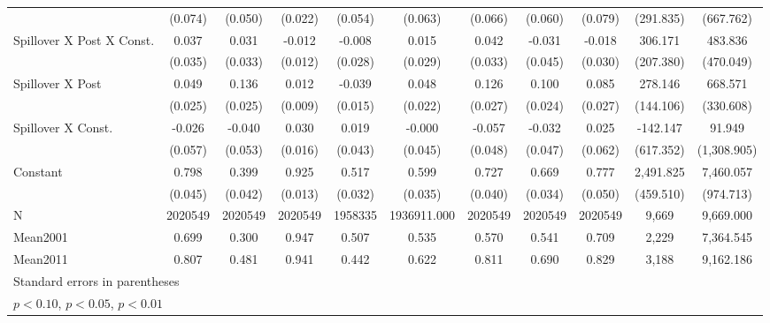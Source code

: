{\begin{tabular}{l*{10}{c}}
                &  (0.074)         &  (0.050)         &  (0.022)         &  (0.054)         &  (0.063)         &  (0.066)         &  (0.060)         &  (0.079)         &(291.835)         &(667.762)         \\
[1em]
Spillover X Post X Const.&    0.037         &    0.031         &   -0.012         &   -0.008         &    0.015         &    0.042         &   -0.031         &   -0.018         &  306.171         &  483.836         \\
                &  (0.035)         &  (0.033)         &  (0.012)         &  (0.028)         &  (0.029)         &  (0.033)         &  (0.045)         &  (0.030)         &(207.380)         &(470.049)         \\
[1em]
Spillover X Post&    0.049\sym{*}  &    0.136\sym{***}&    0.012         &   -0.039\sym{**} &    0.048\sym{**} &    0.126\sym{***}&    0.100\sym{***}&    0.085\sym{***}&  278.146\sym{*}  &  668.571\sym{**} \\
                &  (0.025)         &  (0.025)         &  (0.009)         &  (0.015)         &  (0.022)         &  (0.027)         &  (0.024)         &  (0.027)         &(144.106)         &(330.608)         \\
[1em]
Spillover X Const.&   -0.026         &   -0.040         &    0.030\sym{*}  &    0.019         &   -0.000         &   -0.057         &   -0.032         &    0.025         & -142.147         &   91.949         \\
                &  (0.057)         &  (0.053)         &  (0.016)         &  (0.043)         &  (0.045)         &  (0.048)         &  (0.047)         &  (0.062)         &(617.352)         &(1,308.905)         \\
[1em]
Constant        &    0.798\sym{***}&    0.399\sym{***}&    0.925\sym{***}&    0.517\sym{***}&    0.599\sym{***}&    0.727\sym{***}&    0.669\sym{***}&    0.777\sym{***}&2,491.825\sym{***}&7,460.057\sym{***}\\
                &  (0.045)         &  (0.042)         &  (0.013)         &  (0.032)         &  (0.035)         &  (0.040)         &  (0.034)         &  (0.050)         &(459.510)         &(974.713)         \\
\hline
N               &2020549         &2020549        &2020549         &1958335         &1936911.000         &2020549         &2020549         &2020549         &9,669         &9,669.000         \\
Mean2001        &    0.699         &    0.300         &    0.947         &    0.507         &    0.535         &    0.570         &    0.541         &    0.709         &2,229         &7,364.545         \\
Mean2011        &    0.807         &    0.481         &    0.941         &    0.442         &    0.622         &    0.811         &    0.690         &    0.829         &3,188         &9,162.186         \\
\hline\hline
\multicolumn{11}{l}{\footnotesize Standard errors in parentheses}\\
\multicolumn{11}{l}{\footnotesize \sym{*} \(p<0.10\), \sym{**} \(p<0.05\), \sym{***} \(p<0.01\)}\\
\end{tabular}
}
